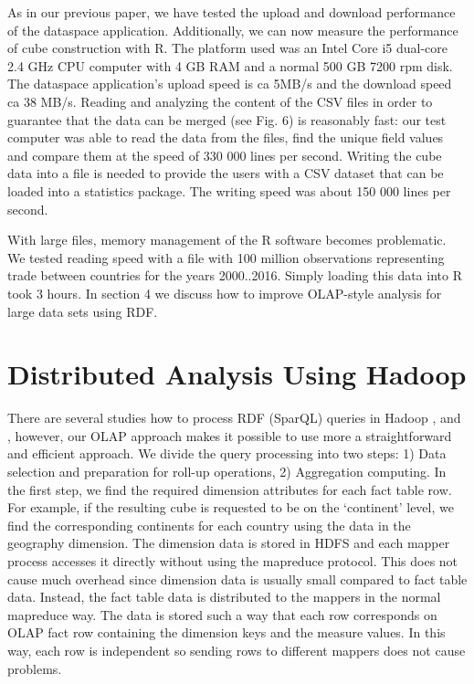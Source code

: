 \documentclass[USenglish,twocolumn]{article}
\begin{document}
As in our previous paper, we have tested the upload and download
performance of the dataspace application. Additionally, we can now
measure the performance of cube construction with R. The platform used
was an Intel Core i5 dual-core 2.4 GHz CPU computer with 4 GB RAM and a
normal 500 GB 7200 rpm disk. The dataspace application's upload speed is
ca 5MB/s and the download speed ca 38 MB/s. Reading and analyzing the
content of the CSV files in order to guarantee that the data can be
merged (see Fig. 6) is reasonably fast: our test computer was able to
read the data from the files, find the unique field values and compare
them at the speed of 330 000 lines per second. Writing the cube data
into a file is needed to provide the users with a CSV dataset that can
be loaded into a statistics package. The writing speed was about 150 000
lines per second.

With large files, memory management of the R software becomes
problematic. We tested reading speed with a file with 100 million
observations representing trade between countries for the years
2000..2016. Simply loading this data into R took 3 hours. In section 4
we discuss how to improve OLAP-style analysis for large data sets using
RDF.


\section{Distributed Analysis Using Hadoop}

There are several studies how to process RDF (SparQL) queries in Hadoop
\cite{Sch14}, \cite{Hus09} and \cite{Kaw16}, however, our OLAP approach makes it possible to use more a
straightforward and efficient approach. We divide the query processing
into two steps: 1) Data selection and preparation for roll-up
operations, 2) Aggregation computing. In the first step, we find the
required dimension attributes for each fact table row. For example, if
the resulting cube is requested to be on the `continent' level, we find
the corresponding continents for each country using the data in the
geography dimension. The dimension data is stored in HDFS and each
mapper process accesses it directly without using the mapreduce
protocol. This does not cause much overhead since dimension data is
usually small compared to fact table data. Instead, the fact table data
is distributed to the mappers in the normal mapreduce way. The data is
stored such a way that each row corresponds on OLAP fact row containing
the dimension keys and the measure values. In this way, each row is
independent so sending rows to different mappers does not cause
problems.
\end{document}
